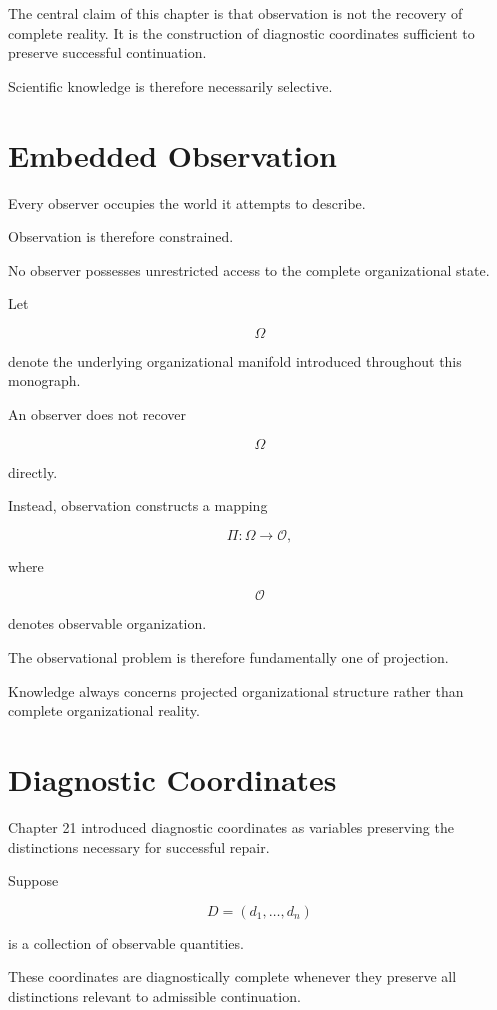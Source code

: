 \documentclass[11pt,oneside]{book}
\numberwithin{equation}{chapter}
\theoremstyle{definition}
\theoremstyle{plain}
\begin{document}
The central claim of this chapter is that observation is not the recovery
of complete reality. It is the construction of diagnostic coordinates
sufficient to preserve successful continuation.

Scientific knowledge is therefore necessarily selective.

\section{Embedded Observation}

Every observer occupies the world it attempts to describe.

Observation is therefore constrained.

No observer possesses unrestricted access to the complete organizational
state.

Let

\[
\Omega
\]

denote the underlying organizational manifold introduced throughout this
monograph.

An observer does not recover

\[
\Omega
\]

directly.

Instead, observation constructs a mapping

\[
\Pi :
\Omega
\rightarrow
\mathcal O,
\]

where

\[
\mathcal O
\]

denotes observable organization.

The observational problem is therefore fundamentally one of projection.

Knowledge always concerns projected organizational structure rather than
complete organizational reality.

\section{Diagnostic Coordinates}

Chapter 21 introduced diagnostic coordinates as variables preserving the
distinctions necessary for successful repair.

Suppose

\[
D
=
(d_1,\ldots,d_n)
\]

is a collection of observable quantities.

These coordinates are diagnostically complete whenever they preserve all
distinctions relevant to admissible continuation.
\end{document}
